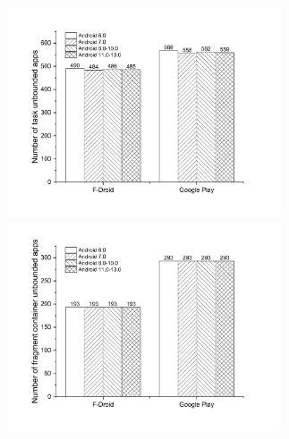\begin{figure}[htbp]
	\begin{minipage}[t]{0.49\linewidth}
		\centering
		\includegraphics[width=3.2in]{cmp-and-task.pdf}
	\end{minipage}
	\begin{minipage}[t]{0.49\linewidth}
		\centering
		\includegraphics[width=3.2in]{cmp-and-frag.pdf}
	\end{minipage}
	\caption{}
	\label{fig:cmp-and}
\end{figure}

